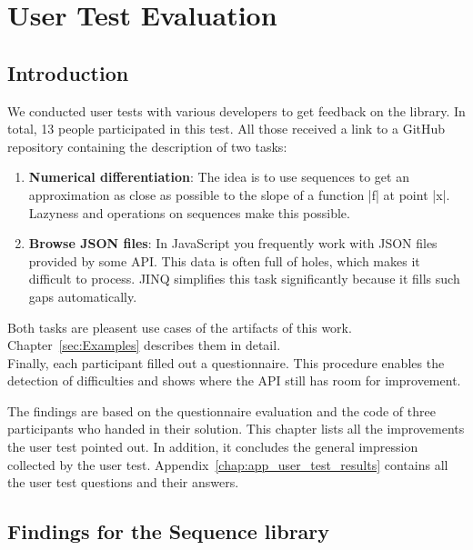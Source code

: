 \section{User Test Evaluation} %
\label{sec:User Test Evaluation}
\subsection{Introduction} %
\label{sub:Introduction}
We conducted user tests with various developers to get feedback on the library.
In total, 13 people participated in this test. All those received a link to a
GitHub repository containing the description of two tasks:
\begin{enumerate}
\item \textbf{Numerical differentiation}: The idea is to use sequences to get
  an approximation as close as possible to the slope of a function |f| at point
  |x|. Lazyness and operations on sequences make this possible.
\item \textbf{Browse JSON files}: In JavaScript you frequently work with JSON
  files provided by some API. This data is often full of holes, which makes it
  difficult to process. JINQ simplifies this task significantly because it
  fills such gaps automatically. 
\end{enumerate}
Both tasks are pleasent use cases of the artifacts of this work.
Chapter~\ref{sec:Examples} describes them in detail.\\
Finally, each participant filled out a questionnaire. This procedure enables
the detection of difficulties and shows where the API still has room for
improvement. 

The findings are based on the questionnaire evaluation and the code of three
participants who handed in their solution. This chapter lists all the
improvements the user test pointed out. In addition, it concludes the general
impression collected by the user test.
Appendix~\ref{chap:app_user_test_results} contains all the user test questions
and their answers.
\subsection{Findings for the Sequence library} %
\label{sub:Findings for the sequence library}
